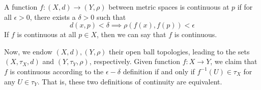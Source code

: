 \documentclass{article}
\begin{document}
    \begin{definition}
    A function $f: (X, d) \longrightarrow (Y, \rho)$ between metric spaces is continuous at $p$ if for all $\epsilon > 0$, there exists a $\delta > 0$ such that 
    \[ d(x, p) < \delta \implies \rho ( f(x), f(p)) < \epsilon\]
    If $f$ is continuous at all $p \in X$, then we can say that $f$ is continuous.
    \end{definition}

    \begin{theorem}
    Now, we endow $(X, d), (Y, \rho)$ their open ball topologies, leading to the sets $(X, \tau_X, d)$ and $(Y, \tau_Y, \rho)$, respectively. Given function $f: X \longrightarrow Y$, we claim that $f$ is continuous according to the $\epsilon - \delta$ definition if and only if $f^{-1}(U) \in \tau_{X}$ for any $U \in \tau_Y$. That is, these two definitions of continuity are equivalent. 
    \end{theorem}
\end{document}
